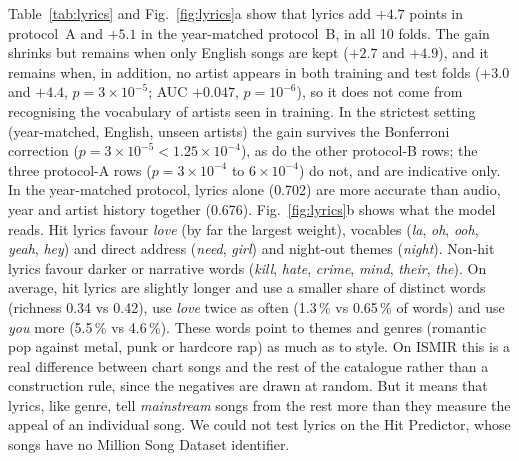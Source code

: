Table~\ref{tab:lyrics} and Fig.~\ref{fig:lyrics}a show that lyrics add $+4.7$ points in protocol~A and
$+5.1$ in the year-matched protocol~B, in all 10 folds. The gain shrinks but remains when only English songs are
kept ($+2.7$ and $+4.9$), and it remains when, in addition, no artist appears in both training and test folds
($+3.0$ and $+4.4$, $p=3\times10^{-5}$; AUC $+0.047$, $p=10^{-6}$), so it does not come from recognising the
vocabulary of artists seen in training. In the strictest setting (year-matched, English, unseen artists) the gain
survives the Bonferroni correction ($p=3\times10^{-5}<1.25\times10^{-4}$), as do the other protocol-B rows; the
three protocol-A rows ($p=3\times10^{-4}$ to $6\times10^{-4}$) do not, and are indicative only. In the year-matched
protocol, lyrics alone (0.702) are more accurate than audio, year and artist history together (0.676).
Fig.~\ref{fig:lyrics}b shows what the model reads. Hit lyrics favour \emph{love} (by far the largest weight),
vocables (\emph{la}, \emph{oh}, \emph{ooh}, \emph{yeah}, \emph{hey}) and direct address (\emph{need},
\emph{girl}) and night-out themes (\emph{night}). Non-hit lyrics favour darker or narrative words (\emph{kill}, \emph{hate},
\emph{crime}, \emph{mind}, \emph{their}, \emph{the}). On average, hit lyrics are slightly longer and use a
smaller share of distinct words (richness 0.34 vs 0.42), use \emph{love} twice as often (1.3\,\% vs 0.65\,\% of words) and
use \emph{you} more (5.5\,\% vs 4.6\,\%). These words point to themes and genres (romantic pop against metal,
punk or hardcore rap) as much as to style. On ISMIR this is a real difference between chart songs and the rest of
the catalogue rather than a construction rule, since the negatives are drawn at random. But it means that lyrics,
like genre, tell \emph{mainstream} songs from the rest more than they measure the appeal of an individual song.
We could not test lyrics on the Hit Predictor, whose songs have no Million Song Dataset identifier.


\FloatBarrier
